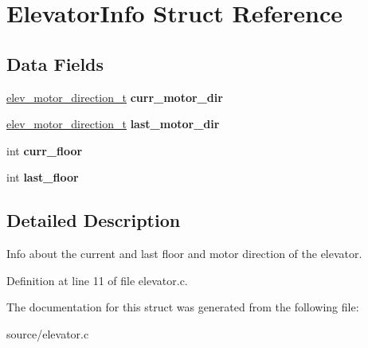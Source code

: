 \hypertarget{structElevatorInfo}{}\section{Elevator\+Info Struct Reference}
\label{structElevatorInfo}
\subsection*{Data Fields}
\begin{DoxyCompactItemize}
\item 
\hyperlink{elev__driver_8h_a2256dfd58fecce253106f83fd2ed607f}{elev\+\_\+motor\+\_\+direction\+\_\+t} {\bfseries curr\+\_\+motor\+\_\+dir}\hypertarget{structElevatorInfo_a434359d6c197328f21b3606bcc9e230f}{}\label{structElevatorInfo_a434359d6c197328f21b3606bcc9e230f}

\item 
\hyperlink{elev__driver_8h_a2256dfd58fecce253106f83fd2ed607f}{elev\+\_\+motor\+\_\+direction\+\_\+t} {\bfseries last\+\_\+motor\+\_\+dir}\hypertarget{structElevatorInfo_a8af2f20601f00ef358921cbc8ac74075}{}\label{structElevatorInfo_a8af2f20601f00ef358921cbc8ac74075}

\item 
int {\bfseries curr\+\_\+floor}\hypertarget{structElevatorInfo_a5c1fa5a5b14e7ec0f300d9243482f67e}{}\label{structElevatorInfo_a5c1fa5a5b14e7ec0f300d9243482f67e}

\item 
int {\bfseries last\+\_\+floor}\hypertarget{structElevatorInfo_a867568f3fa5225973267ce25ee766688}{}\label{structElevatorInfo_a867568f3fa5225973267ce25ee766688}

\end{DoxyCompactItemize}


\subsection{Detailed Description}
Info about the current and last floor and motor direction of the elevator. 

Definition at line 11 of file elevator.\+c.



The documentation for this struct was generated from the following file\+:\begin{DoxyCompactItemize}
\item 
source/elevator.\+c\end{DoxyCompactItemize}
